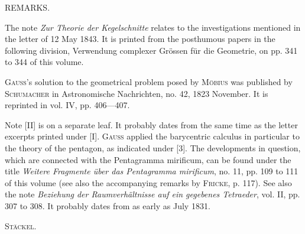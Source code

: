 \begingroup\small
\begin{center}
REMARKS.
\end{center}

The note \emph{Zur Theorie der Kegelschnitte} relates to the investigations mentioned in the letter of 12 May 1843. It is printed from the posthumous papers in the following division, Verwendung complexer Grössen für die Geometrie, on pp. 341 to 344 of this volume.

\textsc{Gauss}'s solution to the geometrical problem posed by \textsc{Möbius} was published by \textsc{Schumacher} in Astronomische Nachrichten, no. 42, 1823 November. It is reprinted in vol. IV, pp. 406---407.

Note [II] is on a separate leaf. It probably dates from the same time as the letter excerpts printed under [I]. \textsc{Gauss} applied the barycentric calculus in particular to the theory of the pentagon, as indicated under [3]. The developments in question, which are connected with the Pentagramma mirificum, can be found under the title \emph{Weitere Fragmente über das Pentagramma mirificum}, no. 11, pp. 109 to 111 of this volume (see also the accompanying remarks by \textsc{Fricke}, p. 117). See also the note \emph{Beziehung der Raumverhältnisse auf ein gegebenes Tetraeder}, vol. II, pp. 307 to 308. It probably dates from as early as July 1831.

\begin{flushright}
\textsc{Stäckel}.
\end{flushright}
\par\endgroup
